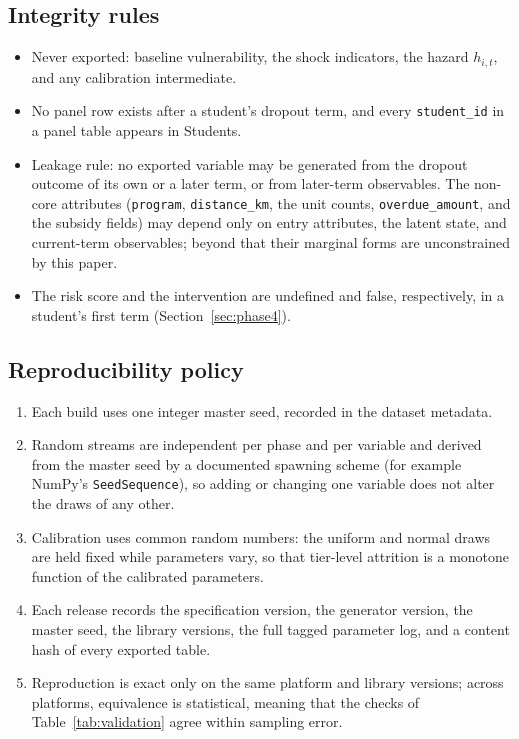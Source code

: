 \documentclass[11pt]{article}
\begin{document}
\subsection{Integrity rules}

\begingroup\sloppy
\begin{itemize}
\item Never exported: baseline vulnerability, the shock indicators, the hazard $h_{i,t}$, and any calibration intermediate.
\item No panel row exists after a student's dropout term, and every \texttt{student\_id} in a panel table appears in Students.
\item Leakage rule: no exported variable may be generated from the dropout outcome of its own or a later term, or from later-term observables. The non-core attributes (\texttt{program}, \texttt{distance\_km}, the unit counts, \texttt{overdue\_amount}, and the subsidy fields) may depend only on entry attributes, the latent state, and current-term observables; beyond that their marginal forms are unconstrained by this paper.
\item The risk score and the intervention are undefined and false, respectively, in a student's first term (Section~\ref{sec:phase4}).
\end{itemize}
\endgroup

\subsection{Reproducibility policy}

\begingroup\sloppy
\begin{enumerate}
\item Each build uses one integer master seed, recorded in the dataset metadata.
\item Random streams are independent per phase and per variable and derived from the master seed by a documented spawning scheme (for example NumPy's \texttt{SeedSequence}), so adding or changing one variable does not alter the draws of any other.
\item Calibration uses common random numbers: the uniform and normal draws are held fixed while parameters vary, so that tier-level attrition is a monotone function of the calibrated parameters.
\item Each release records the specification version, the generator version, the master seed, the library versions, the full tagged parameter log, and a content hash of every exported table.
\item Reproduction is exact only on the same platform and library versions; across platforms, equivalence is statistical, meaning that the checks of Table~\ref{tab:validation} agree within sampling error.
\end{enumerate}
\endgroup



\end{document}
